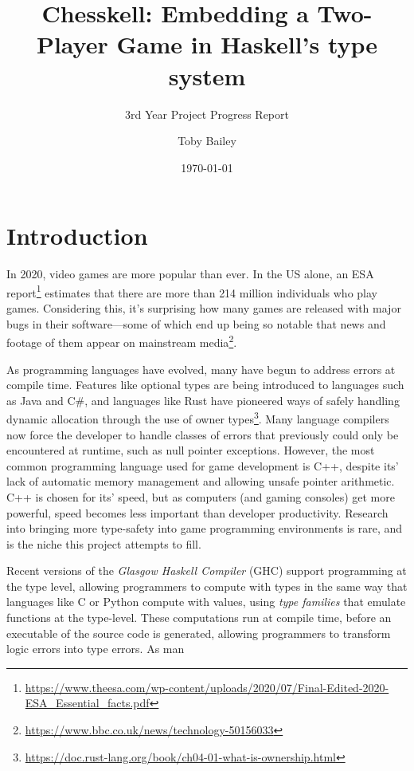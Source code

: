 \documentclass[12pt, a4paper]{scrartcl}
\title{Chesskell: Embedding a Two-Player Game in Haskell's type system}
\subtitle{3rd Year Project Progress Report}
\author{Toby Bailey}
\date{\today}
\begin{document}
\begin{titlepage}
    \maketitle
    \tableofcontents
\end{titlepage}

\section{Introduction}

In 2020, video games are more popular than ever. In the US alone, an ESA report\footnote{\url{https://www.theesa.com/wp-content/uploads/2020/07/Final-Edited-2020-ESA_Essential_facts.pdf}} estimates that there are more than 214 million individuals who play games. Considering this, it's surprising how many games are released with major bugs in their software---some of which end up being so notable that news and footage of them appear on mainstream media\footnote{\url{https://www.bbc.co.uk/news/technology-50156033}}.

As programming languages have evolved, many have begun to address errors at compile time. Features like optional types are being introduced to languages such as Java and C\#, and languages like Rust have pioneered ways of safely handling dynamic allocation through the use of owner types\footnote{\url{https://doc.rust-lang.org/book/ch04-01-what-is-ownership.html}}. Many language compilers now force the developer to handle classes of errors that previously could only be encountered at runtime, such as null pointer exceptions. However, the most common programming language used for game development is C++\cite{gamepp}, despite its' lack of automatic memory management and allowing unsafe pointer arithmetic. C++ is chosen for its' speed, but as computers (and gaming consoles) get more powerful, speed becomes less important than developer productivity. Research into bringing more type-safety into game programming environments is rare, and is the niche this project attempts to fill.

Recent versions of the \emph{Glasgow Haskell Compiler} (GHC) support programming at the type level, allowing programmers to compute with types in the same way that languages like C or Python compute with values\cite{yorgey2012giving}, using \emph{type families} that emulate functions at the type-level. These computations run at compile time, before an executable of the source code is generated, allowing programmers to transform logic errors into type errors\cite{twt}. As man
\end{document}
